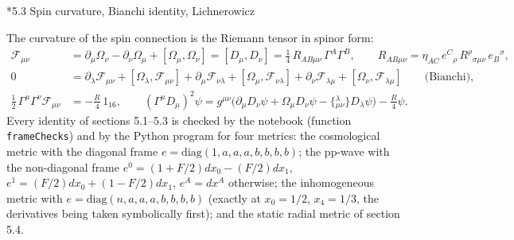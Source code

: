 \documentclass[10pt,a4paper]{article}
\makeatletter
\renewcommand\subsection{\@startsection{subsection}{2}{\z@}{-3.25ex\@plus -1ex \@minus -.2ex}{1.5ex \@plus .2ex}{\normalfont\large\bfseries\raggedright}}
\makeatother
\begin{document}
\subsection*{5.3 Spin curvature, Bianchi identity, Lichnerowicz}
The curvature of the spin connection is the Riemann tensor in spinor form:
\begin{align*}
\mathcal F_{\mu\nu}&=\partial_\mu\Omega_\nu-\partial_\nu\Omega_\mu+[\Omega_\mu,\Omega_\nu]=[D_\mu,D_\nu]=\tfrac14\,R_{AB\mu\nu}\,\Gamma^A\Gamma^B,\qquad R_{AB\mu\nu}=\eta_{AC}\,e^C{}_\rho\,R^\rho{}_{\sigma\mu\nu}\,e_B{}^\sigma, \\
0&=\partial_\lambda \mathcal F_{\mu\nu}+[\Omega_\lambda,\mathcal F_{\mu\nu}]+\partial_\mu \mathcal F_{\nu\lambda}+[\Omega_\mu,\mathcal F_{\nu\lambda}]+\partial_\nu \mathcal F_{\lambda\mu}+[\Omega_\nu,\mathcal F_{\lambda\mu}]\qquad\text{(Bianchi)}, \\
\tfrac12\,\Gamma^\mu\Gamma^\nu \mathcal F_{\mu\nu}&=-\tfrac{R}{4}\,1_{16},\qquad (\Gamma^\mu D_\mu)^2\psi=g^{\mu\nu}\big(\partial_\mu D_\nu\psi+\Omega_\mu D_\nu\psi-\{{}^{\lambda}_{\mu\nu}\}D_\lambda\psi\big)-\tfrac{R}{4}\psi .
\end{align*}
Every identity of sections 5.1–5.3 is checked by the notebook (function \texttt{frameChecks}) and by the Python program for four metrics: the cosmological metric with the diagonal frame $e=\mathrm{diag}(1,a,a,a,b,b,b,b)$; the pp-wave with the non-diagonal frame $e^0=(1+F/2)dx_0-(F/2)dx_1$, $e^1=(F/2)dx_0+(1-F/2)dx_1$, $e^A=dx^A$ otherwise; the inhomogeneous metric with $e=\mathrm{diag}(n,a,a,a,b,b,b,b)$ (exactly at $x_0=1/2$, $x_4=1/3$, the derivatives being taken symbolically first); and the static radial metric of section 5.4.
\end{document}
